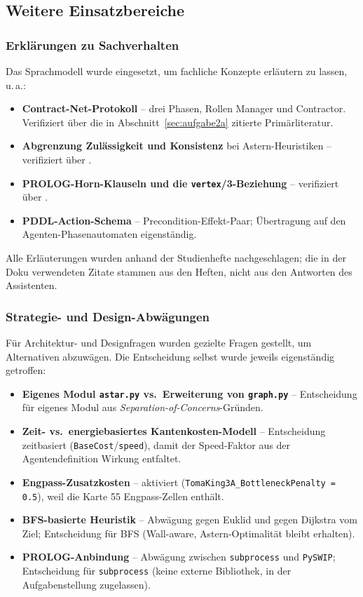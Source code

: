 \subsection{Weitere Einsatzbereiche}

\subsubsection{Erklärungen zu Sachverhalten}

Das Sprachmodell wurde eingesetzt, um fachliche Konzepte erläutern zu lassen, u.\,a.:

\begin{itemize}
    \item \textbf{Contract-Net-Protokoll} -- drei Phasen, Rollen Manager und Contractor. Verifiziert über die in Abschnitt~\ref{sec:aufgabe2a} zitierte Primärliteratur.
    \item \textbf{Abgrenzung Zulässigkeit und Konsistenz} bei \acs{Astern}-Heuristiken -- verifiziert über \textcite[S. 21\,f.]{5}.
    \item \textbf{\acs{PROLOG}-Horn-Klauseln und die \texttt{vertex}/3-Beziehung} -- verifiziert über \textcite[S. 61\,ff.]{4}.
    \item \textbf{\acs{PDDL}-Action-Schema} -- Precondition-Effekt-Paar; Übertragung auf den Agenten-Phasenautomaten eigenständig.
\end{itemize}

Alle Erläuterungen wurden anhand der Studienhefte nachgeschlagen; die in der Doku verwendeten Zitate stammen aus den Heften, nicht aus den Antworten des Assistenten.

\subsubsection{Strategie- und Design-Abwägungen}

Für Architektur- und Designfragen wurden gezielte Fragen gestellt, um Alternativen abzuwägen. Die Entscheidung selbst wurde jeweils eigenständig getroffen:

\begin{itemize}
    \item \textbf{Eigenes Modul \texttt{astar.py} vs.\ Erweiterung von \texttt{graph.py}} -- Entscheidung für eigenes Modul aus \textit{Separation-of-Concerns}-Gründen.
    \item \textbf{Zeit- vs.\ energiebasiertes Kantenkosten-Modell} -- Entscheidung zeitbasiert (\texttt{BaseCost}/\texttt{speed}), damit der Speed-Faktor aus der Agentendefinition Wirkung entfaltet.
    \item \textbf{Engpass-Zusatzkosten} -- aktiviert (\texttt{TomaKing3A\_BottleneckPenalty = 0.5}), weil die Karte 55 Engpass-Zellen enthält.
    \item \textbf{\acs{BFS}-basierte Heuristik} -- Abwägung gegen Euklid und gegen Dijkstra vom Ziel; Entscheidung für \acs{BFS} (Wall-aware, \acs{Astern}-Optimalität bleibt erhalten).
    \item \textbf{\acs{PROLOG}-Anbindung} -- Abwägung zwischen \texttt{subprocess} und \texttt{PySWIP}; Entscheidung für \texttt{subprocess} (keine externe Bibliothek, in der Aufgabenstellung zugelassen).
\end{itemize}


